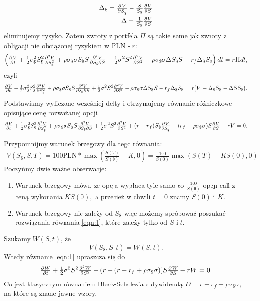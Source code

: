 \documentclass[12pt]{article}
\providecommand{\pd}[3][]{\ensuremath{
\ifinner
\tfrac{\partial{^{#1}}#2}{\partial{#3^{#1}}}
\else
\dfrac{\partial{^{#1}}#2}{\partial{#3^{#1}}}
\fi
}}
\begin{document}
\begin{align*}
    \Delta_\$ = \pd{V}{S_\$} - \tfrac{S}{S_\$} \pd{V}{S} \\
    \Delta = \tfrac{1}{S_\$} \pd{V}{S}
\end{align*}
eliminujemy ryzyko. Zatem zwroty z portfela $\Pi$ są takie same jak zwroty z obligacji nie obciążonej ryzykiem w PLN - $r$:
\begin{align*}
    \left( \pd{V}{t} + \tfrac{1}{2} \sigma_\$^2 S_\$^2 \pd[2]{V}{S_\$}  + \rho \sigma_\$ \sigma S_\$ S \tfrac{\partial^2 V}{\partial S_\$\partial S} + \tfrac{1}{2} \sigma^2 S^2 \pd[2]{V}{S} - \rho \sigma_\$ \sigma \Delta S_\$ S - r_f \Delta_\$ S_\$ \right) dt = r \Pi dt,
\end{align*}
czyli 
\begin{align*}
    \pd{V}{t} + \tfrac{1}{2} \sigma_\$^2 S_\$^2 \pd[2]{V}{S_\$}  + \rho \sigma_\$ \sigma S_\$ S \tfrac{\partial^2 V}{\partial S_\$\partial S} + \tfrac{1}{2} \sigma^2 S^2 \pd[2]{V}{S} - \rho \sigma_\$ \sigma \Delta S_\$ S  - r_f \Delta_\$ S_\$ = r (V- \Delta_\$ S_\$ - \Delta S S_\$).
\end{align*}
Podstawiamy wyliczone wcześniej delty i otrzymujemy równanie różniczkowe opisujące cenę rozważanej opcji. 
\begin{align}\label{eqn:1}
    \pd{V}{t} + \tfrac{1}{2} \sigma_\$^2 S_\$^2 \pd[2]{V}{S_\$}  + \rho \sigma_\$ \sigma S_\$ S \tfrac{\partial^2 V}{\partial S_\$\partial S} + \tfrac{1}{2} \sigma^2 S^2 \pd[2]{V}{S} + (r- r_f) S_\$ \pd{V}{S_\$} + (r_f - \rho \sigma_\$ \sigma) S \pd{V}{S} - rV = 0.
\end{align}

Przypomnijmy warunek brzegowy dla tego równania:
\begin{align*}
    V(S_\$, S, T) =  100 \text{PLN} * \max \left(\tfrac{S(T)}{S(0)} - K, 0 \right) = \tfrac{100}{S(0)} \max( S(T) - KS(0), 0)
\end{align*}
Poczyńmy dwie ważne obserwacje:
\begin{enumerate}
    \item Warunek brzegowy mówi, że opcja wypłaca tyle samo co $\tfrac{100}{S(0)}$ opcji call z ceną wykonania $KS(0), $ a przecież w chwili $t=0$ znamy $S(0)$ i $K$. 
    \item Warunek brzegowy nie zależy od $S_\$$ więc możemy spróbować poszukać rozwiązania równania \ref{eqn:1}, które zależy tylko od $S$ i $t$. 
\end{enumerate}
 Szukamy $W(S, t)$, że 
 $$
    V(S_\$, S, t) = W(S, t).
 $$
 Wtedy równanie \ref{eqn:1} upraszcza się do 
 \begin{align*}
     \pd{W}{t} + \tfrac{1}{2} \sigma^2 S^2 \pd[2]{W}{S} + (r - (r - r_f +\rho \sigma_\$ \sigma )) S \pd{W}{S} - rW = 0.
 \end{align*}
 Co jest klasycznym równaniem Black-Scholes'a z dywidendą $D = r - r_f + \rho \sigma_\$ \sigma$, na które są znane jawne wzory. 
 \newline
\end{document}
